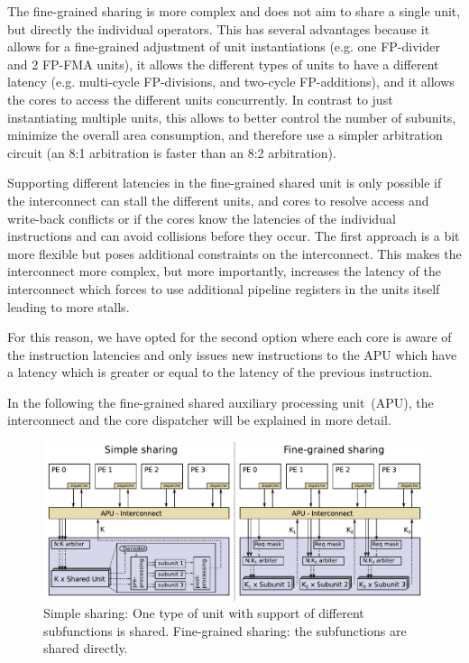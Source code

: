 \documentclass[%
 oneside,      %
 openany,      %
 halfparskip,  %
]{scrbook}
\begin{document}
The fine-grained sharing is more complex and does not aim to share a single unit, but directly the individual operators. This has several advantages because it allows for a fine-grained adjustment of unit instantiations (e.g. one FP-divider and 2 FP-FMA units), it allows the different types of units to have a different latency (e.g. multi-cycle FP-divisions, and two-cycle FP-additions), and it allows the cores to access the different units concurrently.
In contrast to just instantiating multiple units, this allows to better control the number of subunits, minimize the overall area consumption, and therefore use a simpler arbitration circuit (an 8:1 arbitration is faster than an 8:2 arbitration).

Supporting different latencies in the fine-grained shared unit is only possible if the interconnect can stall the different units, and cores to resolve access and write-back conflicts or if the cores know the latencies of the individual instructions and can avoid collisions before they occur. The first approach is a bit more flexible but poses additional constraints on the interconnect. This makes the interconnect more complex, but more importantly, increases the latency of the interconnect which forces to use additional pipeline registers in the units itself leading to more stalls.

For this reason, we have opted for the second option where each core is aware of the instruction latencies and only issues new instructions to the APU which have a latency which is greater or equal to the latency of the previous instruction.

In the following the fine-grained shared auxiliary processing unit~(APU), the interconnect and the core dispatcher will be explained in more detail.

\begin{figure}[t]
\centering
  \includegraphics[width=1\linewidth]{figures/SharedUnit.pdf}
  \caption{Simple sharing: One type of unit with support of different subfunctions is shared. Fine-grained sharing: the subfunctions are shared directly.}
  \label{fig_apu:sharedunit}
\end{figure}
\end{document}
